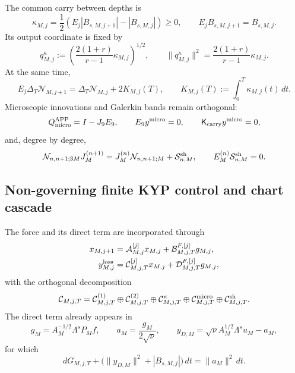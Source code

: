 The common carry between depths is
\begin{equation}
 \kappa_{M,j}
 =\frac12\left(E_j|B_{s,M,j+1}|-|B_{s,M,j}|\right)\ge0,
 \qquad
 E_jB_{s,M,j+1}=B_{s,M,j}.
 \label{eq:ns-import-carry}
\end{equation}
Its output coordinate is fixed by
\begin{equation}
 q_{M,j}^{\kappa}
 :=\left(\frac{2(1+r)}{r-1}\kappa_{M,j}\right)^{1/2},
 \qquad
 \|q_{M,j}^{\kappa}\|^2
 =\frac{2(1+r)}{r-1}\kappa_{M,j}.
 \label{eq:ns-import-carry-port}
\end{equation}
At the same time,
\begin{equation}
 E_j\Delta_T\mathcal N_{M,j+1}
 =\Delta_T\mathcal N_{M,j}+2K_{M,j}(T),
 \qquad
 K_{M,j}(T):=\int_0^T\kappa_{M,j}(t)\,dt.
 \label{eq:ns-import-carry-telescope}
\end{equation}
Microscopic innovations and Galerkin bands remain orthogonal:
\begin{equation}
 Q_{\rm micro}^{\rm APP}=I-J_9E_9,
 \qquad E_9y^{\rm micro}=0,
 \qquad \mathsf K_{\rm carry}y^{\rm micro}=0,
 \label{eq:ns-import-micro}
\end{equation}
and, degree by degree,
\begin{equation}
 \mathcal N_{n,n+1;3M}J_M^{(n+1)}
 =J_M^{(n)}\mathcal N_{n,n+1;M}
 +\mathcal S_{n,M}^{\rm sh},
 \qquad
 E_M^{(n)}\mathcal S_{n,M}^{\rm sh}=0.
 \label{eq:ns-import-shell}
\end{equation}

\subsection{Non-governing finite KYP control and chart cascade}

The force and its direct term are incorporated through
\begin{equation}
 \begin{aligned}
 x_{M,j+1}
 &=\mathcal A_{M,j}^{[j]}x_{M,j}
   +\mathcal B_{M,j,T}^{F,[j]}g_{M,j},\\
 y_{M,j}^{\rm loss}
 &=\mathcal C_{M,j,T}^{[j]}x_{M,j}
   +\mathcal D_{M,j,T}^{F,[j]}g_{M,j},
 \end{aligned}
 \label{eq:ns-import-affine-step}
\end{equation}
with the orthogonal decomposition
\begin{equation}
 \mathcal C_{M,j,T}
 =\mathcal C_{M,j,T}^{(1)}
 \oplus\mathcal C_{M,j,T}^{(2)}
 \oplus\mathcal C_{M,j,T}^{\kappa}
 \oplus\mathcal C_{M,j,T}^{\rm micro}
 \oplus\mathcal C_{M,j,T}^{\rm sh}.
 \label{eq:ns-import-loss-decomposition}
\end{equation}
The direct term already appears in
\[
 g_M=A_M^{-1/2}\Lambda^sP_Mf,
 \qquad
 a_M=\frac{g_M}{2\sqrt\nu},
 \qquad
 y_{D,M}=\sqrt\nu A_M^{1/2}\Lambda^su_M-a_M,
\]
for which
\begin{equation}
 dG_{M,j,T}
 +\bigl(\|y_{D,M}\|^2+|B_{s,M,j}|\bigr)\,dt
 =\|a_M\|^2\,dt.
 \label{eq:ns-import-force-feedthrough}
\end{equation}

